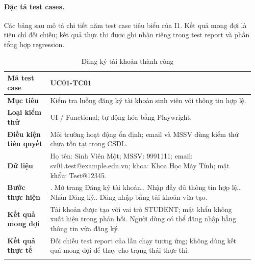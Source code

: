 \paragraph{Đặc tả test cases.}
Các bảng sau mô tả chi tiết năm test case tiêu biểu của I1. Kết quả mong đợi là tiêu chí đối chiếu; kết quả thực thi được ghi nhận riêng trong test report và phần tổng hợp regression.

\begin{table}[H]
\centering
\begingroup\small
\renewcommand{\arraystretch}{1.18}
\caption{Đăng ký tài khoản thành công}\label{tab:i1-detail-1}
\begin{tabularx}{\linewidth}{@{}p{.23\linewidth}>{\raggedright\arraybackslash}X@{}}
\toprule
\textbf{Mã test case} & \textbf{UC01-TC01} \\\midrule
\textbf{Mục tiêu} & Kiểm tra luồng đăng ký tài khoản sinh viên với thông tin hợp lệ. \\ \addlinespace[3pt]
\textbf{Loại kiểm thử} & UI / Functional; tự động hóa bằng Playwright. \\ \addlinespace[3pt]
\textbf{Điều kiện tiên quyết} & Môi trường hoạt động ổn định; email và MSSV dùng kiểm thử chưa tồn tại trong CSDL. \\ \addlinespace[3pt]
\textbf{Dữ liệu} & Họ tên: Sinh Viên Một; MSSV: 9991111; email: sv01.test@example.edu.vn; khoa: Khoa Học Máy Tính; mật khẩu: Test@12345. \\ \addlinespace[3pt]
\textbf{Bước thực hiện} & 1. Mở trang Đăng ký tài khoản.\newline 2. Nhập đầy đủ thông tin hợp lệ.\newline 3. Nhấn Đăng ký.\newline 4. Đăng nhập bằng tài khoản vừa tạo. \\ \addlinespace[3pt]
\textbf{Kết quả mong đợi} & Tài khoản được tạo với vai trò STUDENT; mật khẩu không xuất hiện trong phản hồi. Người dùng có thể đăng nhập bằng thông tin vừa đăng ký. \\ \addlinespace[3pt]
\textbf{Kết quả thực tế} & Đối chiếu test report của lần chạy tương ứng; không dùng kết quả mong đợi để thay cho trạng thái thực thi. \\ \addlinespace[3pt]
\bottomrule
\end{tabularx}
\endgroup
\end{table}

